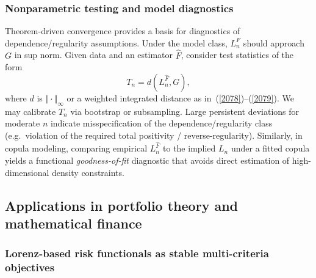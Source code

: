 \documentclass[onecolumn]{article}
\begin{document}
\subsubsection{Nonparametric testing and model diagnostics}

Theorem-driven convergence provides a basis for diagnostics of
dependence/regularity assumptions. Under the model class, $L_{n}^{F}$ should
approach $G$ in sup norm. Given data and an estimator $\widehat{F}$,
consider test statistics of the form 
\begin{equation}
T_{n}=d(L_{n}^{\widehat{F}},G),  \label{2082}
\end{equation}%
where $d$ is $\Vert \cdot \Vert _{\infty }$ or a weighted integrated
distance as in~(\ref{2078})--(\ref{2079}). We may calibrate $T_{n}$ via
bootstrap or subsampling. Large persistent deviations for moderate $n$
indicate misspecification of the dependence/regularity class (e.g.\
violation of the required total positivity / reverse-regularity). Similarly,
in copula modeling, comparing empirical $L_{n}^{\widehat{F}}$ to the implied 
$L_{n}$ under a fitted copula yields a functional \textit{goodness-of-fit }%
diagnostic that avoids direct estimation of high-dimensional density
constraints.

\subsection{Applications in portfolio theory and mathematical finance}

\subsubsection{Lorenz-based risk functionals as stable multi-criteria
objectives}
\end{document}

